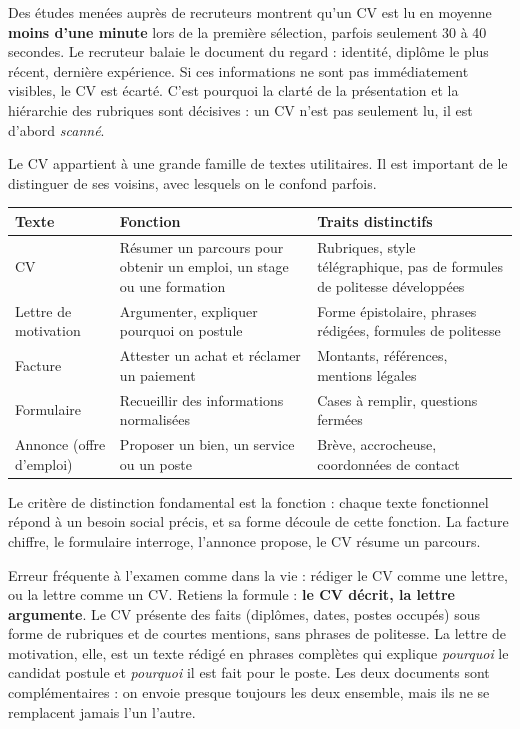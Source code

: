 \documentclass[11pt]{article}
\newcommand{\cle}[1]{{\popxbold\color{popdark}#1}}
\newcounter{popsec}
\newcounter{popsub}
\newcommand{\courssub}[1]{%
  \stepcounter{popsub}%
  \par\vspace{9pt}\noindent{\popxbold\fontsize{11.5}{13}\selectfont\color{popink}{\color{poporange}\thepopsec.\thepopsub}\hspace{6pt}#1}\par\nopagebreak\vspace{4pt}
}
\begin{document}
\begin{savaistu}
Des études menées auprès de recruteurs montrent qu'un CV est lu en moyenne \textbf{moins d'une minute} lors de la première sélection, parfois seulement 30 à 40 secondes. Le recruteur balaie le document du regard : identité, diplôme le plus récent, dernière expérience. Si ces informations ne sont pas immédiatement visibles, le CV est écarté. C'est pourquoi la clarté de la présentation et la hiérarchie des rubriques sont décisives : un CV n'est pas seulement lu, il est d'abord \emph{scanné}.
\end{savaistu}

\courssub{Le CV parmi les textes fonctionnels}

Le CV appartient à une grande famille de textes utilitaires. Il est important de le distinguer de ses voisins, avec lesquels on le confond parfois.

\begin{center}
\begin{tabularx}{\linewidth}{|l|X|X|}
\hline
\rowcolor{popblueL} \textbf{Texte} & \textbf{Fonction} & \textbf{Traits distinctifs} \\
\hline
CV & Résumer un parcours pour obtenir un emploi, un stage ou une formation & Rubriques, style télégraphique, pas de formules de politesse développées \\
\hline
Lettre de motivation & Argumenter, expliquer pourquoi on postule & Forme épistolaire, phrases rédigées, formules de politesse \\
\hline
Facture & Attester un achat et réclamer un paiement & Montants, références, mentions légales \\
\hline
Formulaire & Recueillir des informations normalisées & Cases à remplir, questions fermées \\
\hline
Annonce (offre d'emploi) & Proposer un bien, un service ou un poste & Brève, accrocheuse, coordonnées de contact \\
\hline
\end{tabularx}
\end{center}

Le critère de distinction fondamental est la \cle{fonction} : chaque texte fonctionnel répond à un besoin social précis, et sa forme découle de cette fonction. La facture chiffre, le formulaire interroge, l'annonce propose, le CV résume un parcours.

\begin{attention}
Erreur fréquente à l'examen comme dans la vie : rédiger le CV comme une lettre, ou la lettre comme un CV. Retiens la formule : \textbf{le CV décrit, la lettre argumente}. Le CV présente des faits (diplômes, dates, postes occupés) sous forme de rubriques et de courtes mentions, sans phrases de politesse. La lettre de motivation, elle, est un texte rédigé en phrases complètes qui explique \emph{pourquoi} le candidat postule et \emph{pourquoi} il est fait pour le poste. Les deux documents sont complémentaires : on envoie presque toujours les deux ensemble, mais ils ne se remplacent jamais l'un l'autre.
\end{attention}
\end{document}
